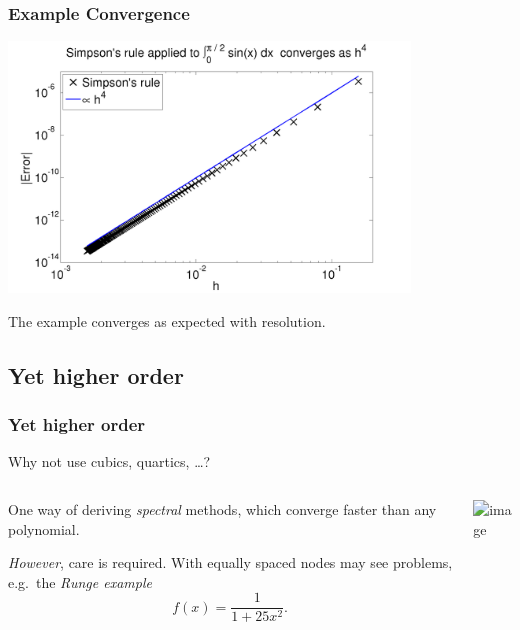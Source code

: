 \documentclass{beamer}
\begin{document}
\begin{frame}
  \frametitle{Example Convergence}

  \begin{center}
    \includegraphics[width=0.8\textwidth]{figures/SimpsonExample1}
  \end{center}
  The example converges as expected with resolution.

\end{frame}


\subsection{Yet higher order}

\begin{frame}
  \frametitle{Yet higher order}

  Why not use cubics, quartics, \dots? \pause

  \vspace{2ex}

  \begin{columns}
    \begin{column}{0.475\textwidth}
      One way of deriving \emph{spectral} methods, which converge
      faster than any polynomial. \pause

      \vspace{1ex}

      \emph{However}, care is required. With equally spaced nodes may
      see problems, e.g.\ the \emph{Runge example}
      \begin{equation*}
        f(x) = \frac{1}{1 + 25 x^2}.
      \end{equation*}
    \end{column}
    \begin{column}{0.525\textwidth}
      \begin{center}
        \includegraphics<3->[width=\textwidth]{figures/RungeExample1_crop}
      \end{center}
    \end{column}
  \end{columns}

\end{frame}
\end{document}
